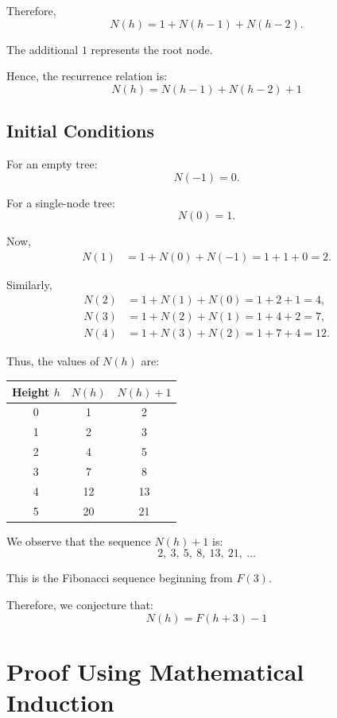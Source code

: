 \documentclass[11pt,a4paper]{article}
\begin{document}
Therefore,
\[
  N(h) = 1 + N(h-1) + N(h-2).
\]

The additional $1$ represents the root node.

Hence, the recurrence relation is:
\[
  \boxed{N(h) = N(h-1) + N(h-2) + 1}
\]

\subsection*{Initial Conditions}

For an empty tree:
\[
  N(-1) = 0.
\]

For a single-node tree:
\[
  N(0) = 1.
\]

Now,
\begin{align*}
  N(1) &= 1 + N(0) + N(-1) = 1 + 1 + 0 = 2.
\end{align*}

Similarly,
\begin{align*}
  N(2) &= 1 + N(1) + N(0) = 1 + 2 + 1 = 4,\\
  N(3) &= 1 + N(2) + N(1) = 1 + 4 + 2 = 7,\\
  N(4) &= 1 + N(3) + N(2) = 1 + 7 + 4 = 12.
\end{align*}

Thus, the values of $N(h)$ are:

\begin{center}
\begin{tabular}{ccc}
  \toprule
  Height $h$ & $N(h)$ & $N(h)+1$ \\
  \midrule
  0 & 1  & 2  \\
  1 & 2  & 3  \\
  2 & 4  & 5  \\
  3 & 7  & 8  \\
  4 & 12 & 13 \\
  5 & 20 & 21 \\
  \bottomrule
\end{tabular}
\end{center}

We observe that the sequence $N(h)+1$ is:
\[
  2,\ 3,\ 5,\ 8,\ 13,\ 21,\ \dots
\]

This is the Fibonacci sequence beginning from $F(3)$.

Therefore, we conjecture that:
\[
  \boxed{N(h) = F(h+3) - 1}
\]

\section{Proof Using Mathematical Induction}
\end{document}
